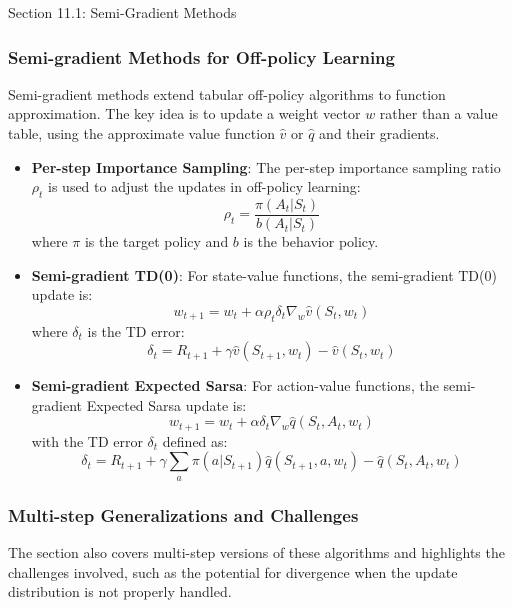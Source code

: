 \begin{notes}{Section 11.1: Semi-Gradient Methods}
    \subsubsection*{Semi-gradient Methods for Off-policy Learning}
    
    Semi-gradient methods extend tabular off-policy algorithms to function approximation. The key idea is to update a weight vector $w$ rather than a value table, using the approximate value function 
    $\hat{v}$ or $\hat{q}$ and their gradients.
    
    \begin{highlight}
    
        \begin{itemize}
            \item \textbf{Per-step Importance Sampling}: The per-step importance sampling ratio $\rho_t$ is used to adjust the updates in off-policy learning:
            \[
            \rho_t = \frac{\pi(A_t | S_t)}{b(A_t | S_t)}
            \]
            where $\pi$ is the target policy and $b$ is the behavior policy.
            \item \textbf{Semi-gradient TD(0)}: For state-value functions, the semi-gradient TD(0) update is:
            \[
            w_{t+1} = w_t + \alpha \rho_t \delta_t \nabla_w \hat{v}(S_t, w_t)
            \]
            where $\delta_t$ is the TD error:
            \[
            \delta_t = R_{t+1} + \gamma \hat{v}(S_{t+1}, w_t) - \hat{v}(S_t, w_t)
            \]
            \item \textbf{Semi-gradient Expected Sarsa}: For action-value functions, the semi-gradient Expected Sarsa update is:
            \[
            w_{t+1} = w_t + \alpha \delta_t \nabla_w \hat{q}(S_t, A_t, w_t)
            \]
            with the TD error $\delta_t$ defined as:
            \[
            \delta_t = R_{t+1} + \gamma \sum_a \pi(a | S_{t+1}) \hat{q}(S_{t+1}, a, w_t) - \hat{q}(S_t, A_t, w_t)
            \]
        \end{itemize}
    
    \end{highlight}
    
    \subsubsection*{Multi-step Generalizations and Challenges}
    
    The section also covers multi-step versions of these algorithms and highlights the challenges involved, such as the potential for divergence when the update distribution is not properly handled.
    

\end{notes}
